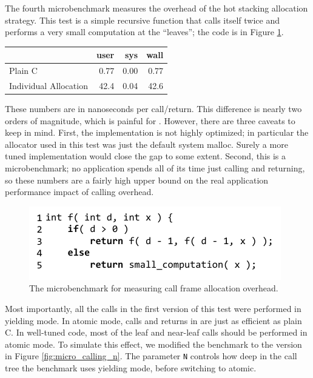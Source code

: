 \documentclass[preprint, 10pt, numbers]{sigplanconf}
\begin{document}
The fourth microbenchmark measures the overhead of the hot stacking allocation strategy.
This test is a simple recursive function that calls itself twice and performs a very small computation at the ``leaves''; the code is in Figure \ref{fig:micro_calling}.

\vspace{1em}
\begin{tabular}{|l|r|r|r|}
  \hline
   & user & sys & wall \\
  \hline
  \hline
  Plain C & 0.77 & 0.00 & 0.77 \\
  \hline
  Individual Allocation & 42.4 & 0.04 & 42.6 \\
  \hline
\end{tabular}
\vspace{1em}

These numbers are in nanoseconds per call/return.
This difference is nearly two orders of magnitude, which is painful for \charcoal{}.
However, there are three caveats to keep in mind.
First, the \charcoal{} implementation is not highly optimized; in particular the allocator used in this test was just the default system malloc.
Surely a more tuned implementation would close the gap to some extent.
Second, this is a microbenchmark; no application spends all of its time just calling and returning, so these numbers are a fairly high upper bound on the real application performance impact of calling overhead.

\begin{figure}
\includegraphics{just_calling_benchmark}
\caption{The microbenchmark for measuring call frame allocation overhead.}
\label{fig:micro_calling}
\end{figure}

Most importantly, all the calls in the first version of this test were performed in yielding mode.
In atomic mode, calls and returns in \charcoal{} are just as efficient as plain C.
In well-tuned \charcoal{} code, most of the leaf and near-leaf calls should be performed in atomic mode.
To simulate this effect, we modified the benchmark to the version in Figure \ref{fig:micro_calling_n}.
The parameter \texttt{N} controls how deep in the call tree the benchmark uses yielding mode, before switching to atomic.
\end{document}
